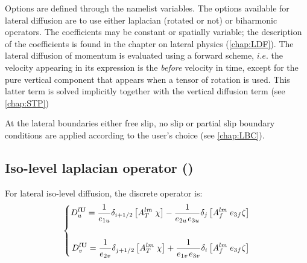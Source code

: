 \documentclass[../tex_main/NEMO_manual]{subfiles}
\begin{document}
Options are defined through the  namelist variables.
The options available for lateral diffusion are to use either laplacian 
(rotated or not) or biharmonic operators. The coefficients may be constant 
or spatially variable; the description of the coefficients is found in the chapter 
on lateral physics (\autoref{chap:LDF}). The lateral diffusion of momentum is 
evaluated using a forward scheme, $i.e.$ the velocity appearing in its expression 
is the \textit{before} velocity in time, except for the pure vertical component 
that appears when a tensor of rotation is used. This latter term is solved 
implicitly together with the vertical diffusion term (see \autoref{chap:STP}) 

At the lateral boundaries either free slip, no slip or partial slip boundary 
conditions are applied according to the user's choice (see \autoref{chap:LBC}).


\subsection[Iso-level laplacian (\protect\np{ln\_dynldf\_lap}\forcode{ = .true.})]
				{Iso-level laplacian operator (\protect{})}
\label{subsec:DYN_ldf_lap}

For lateral iso-level diffusion, the discrete operator is: 
\begin{equation} \label{eq:dynldf_lap}
\left\{ \begin{aligned}
 D_u^{l{\rm {\bf U}}} =\frac{1}{e_{1u} }\delta _{i+1/2} \left[ {A_T^{lm} 
\;\chi } \right]-\frac{1}{e_{2u} {\kern 1pt}e_{3u} }\delta _j \left[ 
{A_f^{lm} \;e_{3f} \zeta } \right] \\ 
\\
 D_v^{l{\rm {\bf U}}} =\frac{1}{e_{2v} }\delta _{j+1/2} \left[ {A_T^{lm} 
\;\chi } \right]+\frac{1}{e_{1v} {\kern 1pt}e_{3v} }\delta _i \left[ 
{A_f^{lm} \;e_{3f} \zeta } \right] \\ 
\end{aligned} \right.
\end{equation} 
\end{document}
